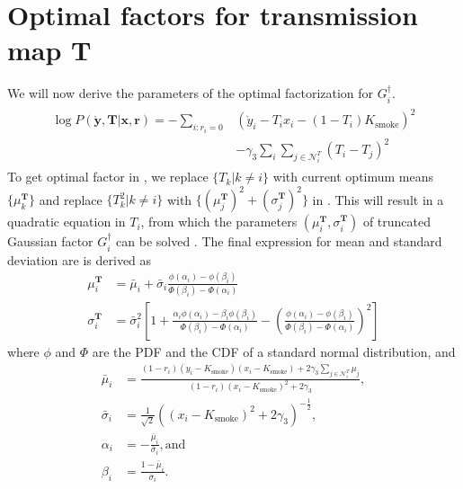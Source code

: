 \appendix

\chapter{Optimal factors for transmission map $\mathbf{T}$ }
\label{app:factorParamsT}

We will now derive the parameters of the optimal factorization for $G^\dagger_i$.
\begin{align}
\begin{split}
\log P \left( \mathbf{\mathring y}, \mathbf{T} | \mathbf{x}, \mathbf{r} \right) = - \sum_{i: r_i = 0} &\left( \mathring{y}_i - T_i x_i - (1-T_i) K_\text{smoke} \right)^2 \\ &- \gamma_3 \sum_{i} \sum_{j \in \mathcal{N}_i^T} (T_i - T_j)^2
\end{split}
\label{eqn:derive_1_factvbem1}
\end{align}
To get optimal factor in , we replace $ \lbrace T_k | k \neq i \rbrace $ with current optimum means $ \lbrace \mu^\mathbf{T}_k \rbrace$ and replace $ \lbrace T_k^2 | k \neq i \rbrace $ with $ \lbrace \left(\mu^\mathbf{T}_j\right)^2 + \left(\sigma^\mathbf{T}_j\right)^2 \rbrace $ in . This will result in a quadratic equation in $T_i$, from which the parameters $ \left( \mu^\mathbf{T}_i, \sigma^\mathbf{T}_i \right) $ of truncated Gaussian factor $G^\dagger_i$ can be solved \cite{johnson1994continuous}. The final expression for mean and standard deviation are is derived as
\begin{align}
\mu^\mathbf{T}_i &= \bar\mu_i + \bar\sigma_i \frac{\phi\left(\alpha_i \right) - \phi\left(\beta_i \right)}{\Phi\left(\beta_i \right) - \Phi\left(\alpha_i \right)} \label{eqn:mean_t_vbem1} \\
%
\sigma^\mathbf{T}_i &= \bar\sigma_i^2 \left[ 1 + \frac{\alpha_i \phi\left(\alpha_i \right) - \beta_i  \phi\left(\beta_i \right)}{\Phi\left(\beta_i \right) - \Phi\left(\alpha_i \right)} - \left(\frac{\phi\left(\alpha_i \right) - \phi\left(\beta_i \right)}{\Phi\left(\beta_i \right) - \Phi\left(\alpha_i \right)} \right)^2 \right] \label{eqn:std_t_vbem1}
\end{align}
where $\phi$ and $\Phi$ are the PDF and the CDF of a standard normal distribution, and
\begin{align*}
\bar{\mu}_i &= \frac{ \left( 1-r_i \right) \left( y_i - K_\text{smoke} \right) \left( x_i - K_\text{smoke} \right) + 2 \gamma_3 \sum_{ j \in \mathcal{N}_i^T } \mu_j } { \left( 1 - r_i \right) \left( x_i - K_\text{smoke} \right)^2 + 2 \gamma_3}, \\
\bar{\sigma}_i &= \frac{ 1 } { \sqrt{2} }\left( \left( x_i - K_\text{smoke} \right)^2 + 2 \gamma_3 \right)^{-\frac{1}{2}},  \\
\alpha_i &= -\frac{\bar\mu_i}{\bar\sigma_i}, \text{and} \\
\beta_i &= \frac{1-\bar\mu_i}{\bar\sigma_i}.
\end{align*}


